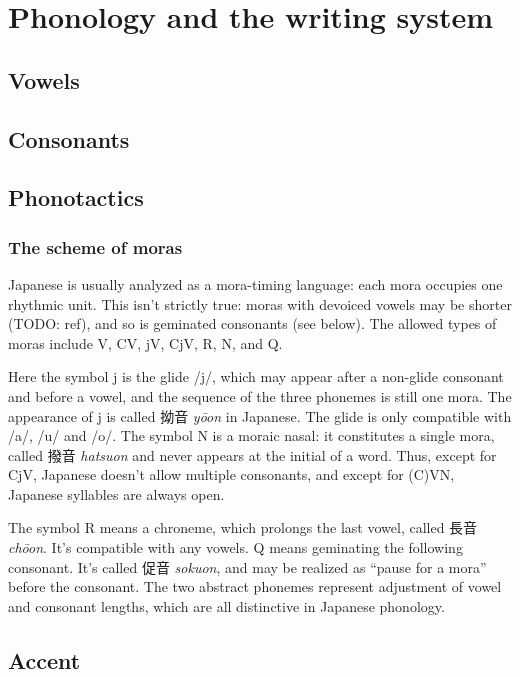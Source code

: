 \documentclass[UTF8, a4paper, oneside, scheme=plain]{ctexrep}
\newcommand{\corpus}[1]{\emph{#1}}
\begin{document}
\chapter{Phonology and the writing system}

\section{Vowels}

\section{Consonants}

\section{Phonotactics}

\subsection{The scheme of moras}

Japanese is usually analyzed as a mora-timing language:
each mora occupies one rhythmic unit.
This isn't strictly true:
moras with devoiced vowels may be shorter (TODO: ref),
and so is geminated consonants (see below).
The allowed types of moras include V, CV, jV, CjV, R, N, and Q.

Here the symbol j is the glide /j/,
which may appear after a non-glide consonant and before a vowel,
and the sequence of the three phonemes is still one mora.
The appearance of j is called 拗音 \corpus{yōon} in Japanese.
The glide is only compatible with /a/, /u/ and /o/.
The symbol N is a moraic nasal:
it constitutes a single mora, called 撥音 \corpus{hatsuon} 
and never appears at the initial of a word.
Thus, except for CjV, Japanese doesn't allow multiple consonants,
and except for (C)VN, Japanese syllables are always open.

The symbol R means a chroneme,
which prolongs the last vowel,
called 長音 \corpus{chōon}.
It's compatible with any vowels.
Q means geminating the following consonant.
It's called 促音 \corpus{sokuon},
and may be realized as ``pause for a mora'' before the consonant. 
The two abstract phonemes represent adjustment of vowel and consonant lengths,
which are all distinctive in Japanese phonology.

\section{Accent}
\end{document}
